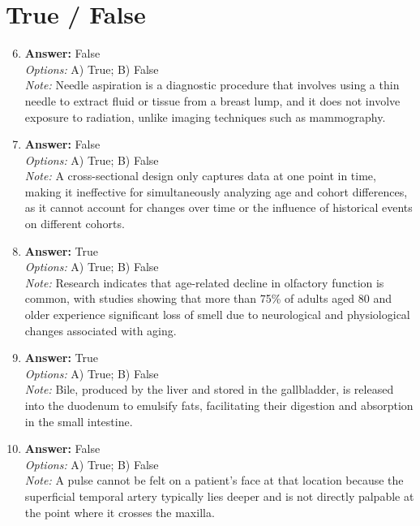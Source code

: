 \documentclass[12pt]{article}
\begin{document}
\section*{True / False}
\begin{enumerate}[label=\arabic*.]
\setcounter{enumi}{5}
\item \textbf{Answer:} False
\\ \textit{Options:} A) True; B) False
\\ \textit{Note:} Needle aspiration is a diagnostic procedure that involves using a thin needle to extract fluid or tissue from a breast lump, and it does not involve exposure to radiation, unlike imaging techniques such as mammography.
\item \textbf{Answer:} False
\\ \textit{Options:} A) True; B) False
\\ \textit{Note:} A cross-sectional design only captures data at one point in time, making it ineffective for simultaneously analyzing age and cohort differences, as it cannot account for changes over time or the influence of historical events on different cohorts.
\item \textbf{Answer:} True
\\ \textit{Options:} A) True; B) False
\\ \textit{Note:} Research indicates that age-related decline in olfactory function is common, with studies showing that more than 75\% of adults aged 80 and older experience significant loss of smell due to neurological and physiological changes associated with aging.
\item \textbf{Answer:} True
\\ \textit{Options:} A) True; B) False
\\ \textit{Note:} Bile, produced by the liver and stored in the gallbladder, is released into the duodenum to emulsify fats, facilitating their digestion and absorption in the small intestine.
\item \textbf{Answer:} False
\\ \textit{Options:} A) True; B) False
\\ \textit{Note:} A pulse cannot be felt on a patient's face at that location because the superficial temporal artery typically lies deeper and is not directly palpable at the point where it crosses the maxilla.
\end{enumerate}
\end{document}
